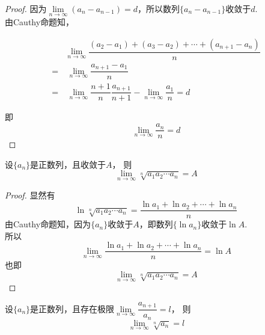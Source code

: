 \begin{proof}

    因为$\lim\limits_{n \to \infty}{(a_n - a_{n - 1})} = d$，所以数列$\{a_n - a_{n - 1}\}$收敛于$d$. \\
    由\textup{Cauthy}命题知，
    
    \begin{align*}
        & \lim\limits_{n \to \infty}{\dfrac{(a_2 - a_1) + (a_3 - a_2) + \cdots + (a_{n + 1} - a_n)}{n}} \\
        = & \ \lim\limits_{n \to \infty}{\dfrac{a_{n + 1} - a_1}{n}} \\
        = & \ \lim\limits_{n \to \infty}{\dfrac{n + 1}{n} \dfrac{a_{n + 1}}{n + 1}} - \lim\limits_{n \to \infty}{\dfrac{a_1}{n}} = d
    \end{align*}

    即
    \[\lim\limits_{n \to \infty}{\dfrac{a_n}{n}} = d\]

\end{proof}

\begin{corollary}[Cauthy命题推论]

    设$\{a_n\}$是正数列，且收敛于$A$，
    则
    \[\lim\limits_{n \to \infty}{\sqrt[n]{a_1a_2\cdots a_n}} = A\]

\end{corollary}

\begin{proof}

    显然有
    \[\ln{\sqrt[n]{a_1 a_2 \cdots a_n}} = \dfrac{\ln{a_1} + \ln{a_2} + \cdots + \ln{a_n}}{n}\]
    由\textup{Cauthy}命题知，因为$\{a_n\}$收敛于$A$，即数列$\{\ln{a_n}\}$收敛于$\ln{A}$. \\    
    所以
    \[\lim\limits_{n \to \infty}{\dfrac{\ln{a_1} + \ln{a_2} + \cdots + \ln{a_n}}{n}} = \ln{A}\]
    也即
    \[\lim\limits_{n \to \infty}{\sqrt[n]{a_1 a_2 \cdots a_n}} = A\]

\end{proof}


\begin{corollary}[Cauthy命题推论]

    设$\{a_n\}$是正数列，且存在极限$\lim\limits_{n \to \infty}{\dfrac{a_{n + 1}}{a_n}} = l$，
    则
    \[\lim\limits_{n \to \infty}{\sqrt[n]{a_n}} = l\]

\end{corollary}

